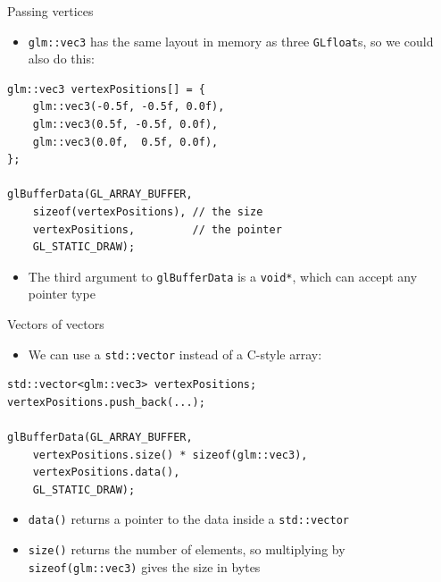\begin{frame}[fragile]{Passing vertices}
	\begin{itemize}
		\pause\item \lstinline{glm::vec3} has the same layout in memory as three \lstinline{GLfloat}s, so we could also do this:
	\end{itemize}
	\pause\begin{lstlisting}
glm::vec3 vertexPositions[] = {
    glm::vec3(-0.5f, -0.5f, 0.0f),
    glm::vec3(0.5f, -0.5f, 0.0f),
    glm::vec3(0.0f,  0.5f, 0.0f),
};

glBufferData(GL_ARRAY_BUFFER,
	sizeof(vertexPositions), // the size
	vertexPositions,         // the pointer
	GL_STATIC_DRAW);
	\end{lstlisting}
	\begin{itemize}
		\pause\item The third argument to \lstinline{glBufferData} is a \lstinline{void*}, which can accept any pointer type
	\end{itemize}
\end{frame}

\begin{frame}[fragile]{Vectors of vectors}
	\begin{itemize}
		\pause\item We can use a \lstinline{std::vector} instead of a C-style array:
	\end{itemize}
	\pause\begin{lstlisting}
std::vector<glm::vec3> vertexPositions;
vertexPositions.push_back(...);

glBufferData(GL_ARRAY_BUFFER,
	vertexPositions.size() * sizeof(glm::vec3),
	vertexPositions.data(),
	GL_STATIC_DRAW);
	\end{lstlisting}
	\begin{itemize}
		\pause\item \lstinline{data()} returns a pointer to the data inside a \lstinline{std::vector}
		\pause\item \lstinline{size()} returns the number of elements,
			so multiplying by \lstinline{sizeof(glm::vec3)} gives the size in bytes
	\end{itemize}
\end{frame}

